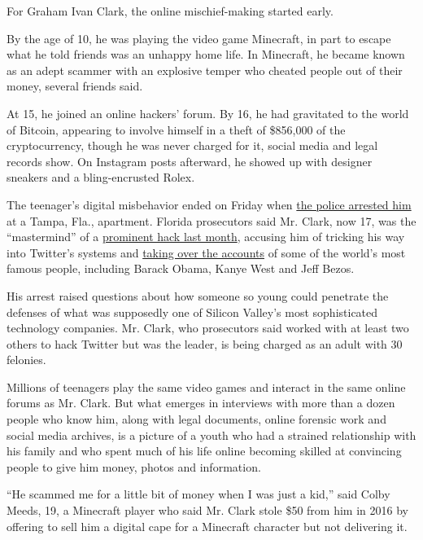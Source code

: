 For Graham Ivan Clark, the online mischief-making started early.

By the age of 10, he was playing the video game Minecraft, in part to
escape what he told friends was an unhappy home life. In Minecraft, he
became known as an adept scammer with an explosive temper who cheated
people out of their money, several friends said.

At 15, he joined an online hackers' forum. By 16, he had gravitated to
the world of Bitcoin, appearing to involve himself in a theft of
\$856,000 of the cryptocurrency, though he was never charged for it,
social media and legal records show. On Instagram posts afterward, he
showed up with designer sneakers and a bling-encrusted Rolex.

The teenager's digital misbehavior ended on Friday when
\href{https://www.nytimes3xbfgragh.onion/2020/07/31/technology/twitter-hack-arrest.html}{the
police arrested him} at a Tampa, Fla., apartment. Florida prosecutors
said Mr. Clark, now 17, was the ``mastermind'' of a
\href{https://www.nytimes3xbfgragh.onion/2020/07/17/technology/twitter-hackers-interview.html}{prominent
hack last month}, accusing him of tricking his way into Twitter's
systems and
\href{https://www.nytimes3xbfgragh.onion/2020/07/15/technology/twitter-hack-bill-gates-elon-musk.html}{taking
over the accounts} of some of the world's most famous people, including
Barack Obama, Kanye West and Jeff Bezos.

His arrest raised questions about how someone so young could penetrate
the defenses of what was supposedly one of Silicon Valley's most
sophisticated technology companies. Mr. Clark, who prosecutors said
worked with at least two others to hack Twitter but was the leader, is
being charged as an adult with 30 felonies.

Millions of teenagers play the same video games and interact in the same
online forums as Mr. Clark. But what emerges in interviews with more
than a dozen people who know him, along with legal documents, online
forensic work and social media archives, is a picture of a youth who had
a strained relationship with his family and who spent much of his life
online becoming skilled at convincing people to give him money, photos
and information.

``He scammed me for a little bit of money when I was just a kid,'' said
Colby Meeds, 19, a Minecraft player who said Mr. Clark stole \$50 from
him in 2016 by offering to sell him a digital cape for a Minecraft
character but not delivering it.

